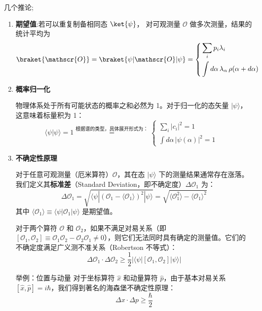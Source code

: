     
几个推论;\begin{enumerate}
    \item \textbf{期望值}:若可以重复制备相同态 $\ket{\psi}$，
        对可观测量 $\mathscr{O}$ 做多次测量，结果的统计平均为
        \begin{equation}
            \braket{\mathscr{O}}=\braket{\psi|\mathscr{O}|\psi}=\left\{\begin{aligned}
            &\sum_i p_i \lambda_i\\
            &\int d\alpha\, \lambda_\alpha\, \rho(\alpha+d\alpha)
        \end{aligned}\right.
        \end{equation}
    \item \textbf{概率归一化}
    
    物理体系处于所有可能状态的概率之和必然为 1。对于归一化的态矢量 $|\psi\rangle$，这意味着标量积为 1：
    \begin{equation}
        \langle \psi | \psi \rangle = 1\overset{ 根据谱的类型，具体展开形式为：}{=}      \begin{cases}
            \displaystyle \sum_i |c_i|^2 = 1 &  \\
            \displaystyle \int d\alpha \, |\psi(\alpha)|^2 = 1 & 
        \end{cases}
    \end{equation}

    \item \textbf{不确定性原理}
    
    对于任意可观测量（厄米算符）$\mathscr{O}$，其在态 $|\psi\rangle$ 下的测量结果通常存在涨落。我们定义其\textbf{标准差}（Standard Deviation，即不确定度）$\Delta \mathscr{O}_1$ 为：
    \begin{equation}
        \Delta \mathscr{O}_1 = \sqrt{\langle \psi | (\mathscr{O}_1 - \langle \mathscr{O}_1 \rangle)^2 | \psi \rangle} = \sqrt{\langle \mathscr{O}_1^2 \rangle - \langle \mathscr{O}_1 \rangle^2}
    \end{equation}
    其中 $\langle \mathscr{O}_1 \rangle \equiv \langle \psi | \mathscr{O}_1 | \psi \rangle$ 是期望值。
    
    对于两个算符 $\mathscr{O}$ 和 $\mathscr{O}_2$，如果不满足对易关系（即 $[\mathscr{O}_1, \mathscr{O}_2] \equiv \mathscr{O}_1\mathscr{O}_2 - \mathscr{O}_2\mathscr{O}_1 \neq 0$），则它们无法同时具有确定的测量值。它们的不确定度满足广义测不准关系（Robertson 不等式）：
    \begin{equation}
        \Delta \mathscr{O}_1 \cdot \Delta \mathscr{O}_2 \ge \frac{1}{2} \left| \langle \psi | [\mathscr{O}_1, \mathscr{O}_2] | \psi \rangle \right|
    \end{equation}
    
    举例：位置与动量 对于坐标算符 $\hat{x}$ 和动量算符 $\hat{p}$，由于基本对易关系 $[\hat{x}, \hat{p}] = i\hbar$，我们得到著名的海森堡不确定性原理：
    \begin{equation}
        \Delta x \cdot \Delta p \ge \frac{\hbar}{2}
    \end{equation}
\end{enumerate}







